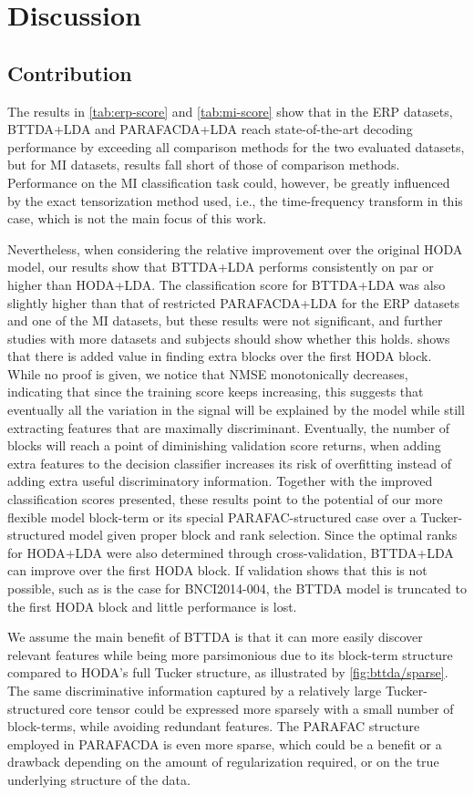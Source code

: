 \documentclass[10pt]{iopart}
\begin{document}
\section{Discussion}
\subsection{Contribution}
The results in \cref{tab:erp-score} and \autoref{tab:mi-score} show that
in the ERP datasets, BTTDA+LDA and PARAFACDA+LDA reach state-of-the-art decoding performance by
exceeding all comparison methods for the two evaluated datasets, but
for MI datasets, results fall short of those of comparison methods.
Performance on the MI classification task could, however, be greatly influenced
by the exact tensorization method used, i.e., the time-frequency transform in
this case, which is not the main focus of this work.

Nevertheless, when considering the relative improvement over the original
HODA model, our results show that BTTDA+LDA performs consistently on par or higher than HODA+LDA.
The classification score for BTTDA+LDA was also slightly higher than that of
restricted PARAFACDA+LDA for the ERP datasets and one of the MI datasets, but these
results were not significant, and further studies with more datasets and
subjects should show whether this holds.
 shows that there is added value in finding extra blocks
over the first HODA block.
While no proof is given, we notice that NMSE monotonically decreases, indicating that
since the training score keeps increasing, this suggests that
eventually all the variation in the signal will be explained by the model
while still extracting features that are maximally discriminant.
Eventually, the number of blocks will reach a point of diminishing validation
score returns, when adding extra features to the decision classifier increases
its risk of overfitting instead of adding extra useful discriminatory
information.
Together with the improved classification scores presented, these results
point to the potential of our more flexible model block-term or
its special PARAFAC-structured case over a Tucker-structured model given proper block and
rank selection.
Since the optimal ranks for HODA+LDA were also determined through
cross-validation, BTTDA+LDA can improve over the first HODA block.
If validation shows that this is not possible, such as is the case for
BNCI2014-004, the BTTDA model is truncated to the first HODA block and little
performance is lost.

We assume the main benefit of BTTDA is that it can more easily discover relevant
features while
being more parsimonious due to its block-term structure compared to HODA's full
Tucker structure, as illustrated by \cref{fig:bttda/sparse}.
The same discriminative information captured by a relatively large
Tucker-structured core tensor could be expressed more sparsely with a small
number of block-terms, while avoiding redundant features.
The PARAFAC structure employed in PARAFACDA is even more sparse, which could be
a benefit or a drawback depending on the amount of regularization required,
or on the true underlying structure of the data.
\end{document}
